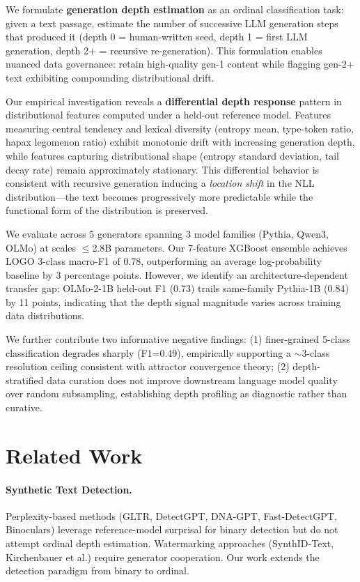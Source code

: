 \documentclass[11pt,a4paper]{article}
\begin{document}
We formulate \textbf{generation depth estimation} as an ordinal classification task: given a text passage, estimate the number of successive LLM generation steps that produced it (depth 0 = human-written seed, depth 1 = first LLM generation, depth 2+ = recursive re-generation).
This formulation enables nuanced data governance: retain high-quality gen-1 content while flagging gen-2+ text exhibiting compounding distributional drift.

Our empirical investigation reveals a \textbf{differential depth response} pattern in distributional features computed under a held-out reference model.
Features measuring central tendency and lexical diversity (entropy mean, type-token ratio, hapax legomenon ratio) exhibit monotonic drift with increasing generation depth, while features capturing distributional shape (entropy standard deviation, tail decay rate) remain approximately stationary.
This differential behavior is consistent with recursive generation inducing a \emph{location shift} in the NLL distribution---the text becomes progressively more predictable while the functional form of the distribution is preserved.

We evaluate across 5 generators spanning 3 model families (Pythia, Qwen3, OLMo) at scales $\leq$2.8B parameters.
Our 7-feature XGBoost ensemble achieves LOGO 3-class macro-F1 of 0.78, outperforming an average log-probability baseline by 3 percentage points.
However, we identify an architecture-dependent transfer gap: OLMo-2-1B held-out F1 (0.73) trails same-family Pythia-1B (0.84) by 11 points, indicating that the depth signal magnitude varies across training data distributions.

We further contribute two informative negative findings: (1) finer-grained 5-class classification degrades sharply (F1=0.49), empirically supporting a $\sim$3-class resolution ceiling consistent with attractor convergence theory; (2) depth-stratified data curation does not improve downstream language model quality over random subsampling, establishing depth profiling as diagnostic rather than curative.

\section{Related Work}

\paragraph{Synthetic Text Detection.}
Perplexity-based methods (GLTR, DetectGPT, DNA-GPT, Fast-DetectGPT, Binoculars) leverage reference-model surprisal for binary detection but do not attempt ordinal depth estimation.
Watermarking approaches (SynthID-Text, Kirchenbauer et al.) require generator cooperation.
Our work extends the detection paradigm from binary to ordinal.
\end{document}
